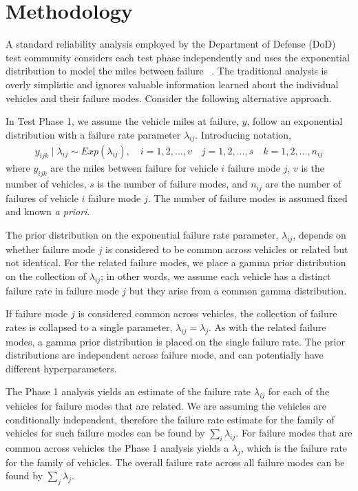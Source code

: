 \documentclass[12pt]{article}
\begin{document}

\section{Methodology}
A standard reliability analysis employed by the Department of Defense (DoD) test community considers each test phase independently and uses the exponential distribution to model the miles between failure ~\cite{ref1}. The traditional analysis is overly simplistic and ignores valuable information learned about the individual vehicles and their failure modes. Consider the following alternative approach.

In Test Phase 1, we assume the vehicle miles at failure, $y$, follow an exponential distribution with a failure rate parameter $\lambda_{ij}$. Introducing notation,
\begin{align}\label{eq:m1}
y_{ijk}\mid\lambda_{ij}\sim Exp(\lambda_{ij}), \quad i = 1,2,...,v \quad j=1,2,...,s \quad k=1,2,...,n_{ij}
\end{align}
where $y_{ijk}$ are the miles between failure for vehicle $i$ failure mode $j$, $v$ is the number of vehicles, $s$ is the number of failure modes, and $n_{ij}$ are the number of failures of vehicle $i$ failure mode $j$. The number of failure modes is assumed fixed and known \textit{a priori}.

The prior distribution on the exponential failure rate parameter, $\lambda_{ij}$, depends on whether failure mode $j$ is considered to be common across vehicles or related but not identical. For the related failure modes, we place a gamma prior distribution on the collection of $\lambda_{ij}$; in other words, we assume each vehicle has a distinct failure rate in failure mode $j$ but they arise from a common gamma distribution.

If failure mode $j$ is considered common across vehicles, the collection of failure rates is collapsed to a single parameter, $\lambda_{ij} = \lambda_j$. As with the related failure modes, a gamma prior distribution is placed on the single failure rate. The prior distributions are independent across failure mode, and can potentially have different hyperparameters.

The Phase 1 analysis yields an estimate of the failure rate $\lambda_{ij}$ for each of the vehicles for failure modes that are related. We are assuming the vehicles are conditionally independent, therefore the failure rate estimate for the family of vehicles for such failure modes can be found by $\sum_{i}\lambda_{ij}$. For failure modes that are common across vehicles the Phase 1 analysis yields a $\lambda_{j}$, which is the failure rate for the family of vehicles. The overall failure rate across all failure modes can be found by $\sum_{j}\lambda_{j}$.
\end{document}
